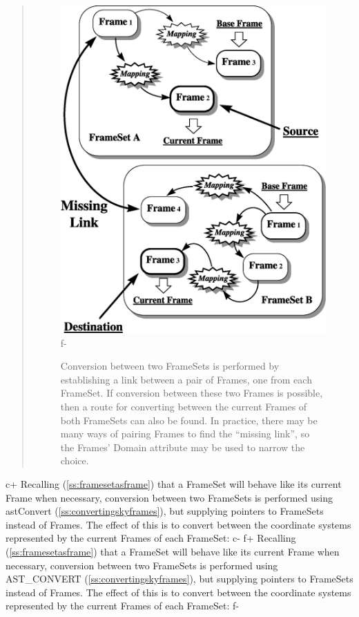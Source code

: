 \documentclass[twoside,11pt]{article}
\newcommand{\secref}[1]{\S\ref{#1}}
\renewcommand{\secref}[1]{\ref{#1}}
\begin{document}
\begin{htmlonly}
\begin{quote}
\begin{figure}
   \includegraphics[scale=1.0]{sun210_figures/fsalign.eps}
f-
   \caption{Conversion between two FrameSets is performed by establishing
   a link between a pair of Frames, one from each FrameSet. If conversion
   between these two Frames is possible, then a route for converting
   between the current Frames of both FrameSets can also be found. In
   practice, there may be many ways of pairing Frames to find the
   ``missing link'', so the Frames' Domain attribute may be used to
   narrow the choice.}
   \end{figure}
   \end{quote}
\end{htmlonly}
c+
Recalling (\secref{ss:framesetasframe}) that a FrameSet will behave
like its current Frame when necessary, conversion between two
FrameSets is performed using astConvert
(\secref{ss:convertingskyframes}), but supplying pointers to FrameSets
instead of Frames. The effect of this is to convert between the
coordinate systems represented by the current Frames of each FrameSet:
c-
f+
Recalling (\secref{ss:framesetasframe}) that a FrameSet will behave
like its current Frame when necessary, conversion between two
FrameSets is performed using AST\_CONVERT
(\secref{ss:convertingskyframes}), but supplying pointers to FrameSets
instead of Frames. The effect of this is to convert between the
coordinate systems represented by the current Frames of each FrameSet:
f-
\end{document}

